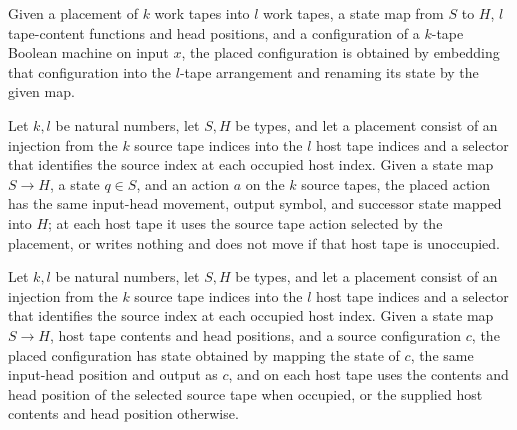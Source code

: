 \begin{definition}
\label{Complexity.clPlacedCfg}
\leanok
{}
Given a placement of $k$ work tapes into $l$ work tapes, a state map from $S$ to $H$,
$l$ tape-content functions and head positions, and a configuration of a $k$-tape Boolean
machine on input $x$, the placed configuration is obtained by embedding that
configuration into the $l$-tape arrangement and renaming its state by the given map.
\end{definition}

\begin{lemma}
\label{Complexity.clPlacedAction_eq}
\leanok
{}
Let $k,l$ be natural numbers, let $S,H$ be types, and let a placement consist of an
injection from the $k$ source tape indices into the $l$ host tape indices and a selector
that identifies the source index at each occupied host index. Given a state map $S\to
H$, a state $q\in S$, and an action $a$ on the $k$ source tapes, the placed action has
the same input-head movement, output symbol, and successor state mapped into $H$; at
each host tape it uses the source tape action selected by the placement, or writes
nothing and does not move if that host tape is unoccupied.
\end{lemma}

\begin{lemma}
\label{Complexity.clPlacedCfg_eq}
\leanok
{}
Let $k,l$ be natural numbers, let $S,H$ be types, and let a placement consist of an
injection from the $k$ source tape indices into the $l$ host tape indices and a selector
that identifies the source index at each occupied host index. Given a state map $S\to
H$, host tape contents and head positions, and a source configuration $c$, the placed
configuration has state obtained by mapping the state of $c$, the same input-head
position and output as $c$, and on each host tape uses the contents and head position of
the selected source tape when occupied, or the supplied host contents and head position
otherwise.
\end{lemma}

